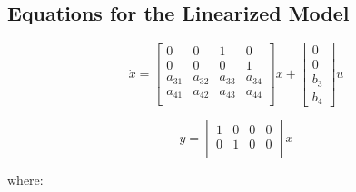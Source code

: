 \documentclass[main.tex]{subfiles}
\begin{document}
	
\subsection*{Equations for the Linearized Model}\label{AppB:LinearizedModel}
\begin{equation*}
\dot{x} = 
\begin{bmatrix}
0 & 0 & 1 & 0 \\
0 & 0 & 0 & 1 \\
a_{31} & a_{32} & a_{33} & a_{34} \\
a_{41} & a_{42} & a_{43} & a_{44} \\
\end{bmatrix} x +
\begin{bmatrix}
0 \\
0 \\
b_3 \\
b_4
\end{bmatrix} u
\end{equation*}

\begin{equation*}
y = 
\begin{bmatrix}
1 & 0 & 0 & 0 \\
0 & 1 & 0 & 0 \\
\end{bmatrix}x
\end{equation*}

where:
\end{document}
